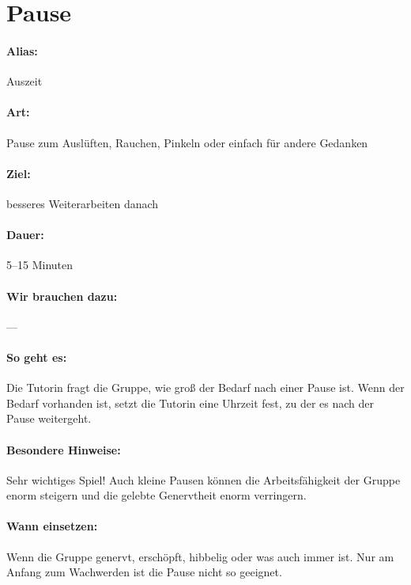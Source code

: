 \section{Pause}
\paragraph{Alias:} Auszeit
\paragraph{Art:} Pause zum Auslüften, Rauchen, Pinkeln oder einfach für andere Gedanken
\paragraph{Ziel:} besseres Weiterarbeiten danach
\paragraph{Dauer:} 5--15 Minuten
\paragraph{Wir brauchen dazu:} ---
\paragraph{So geht es:} Die Tutorin fragt die Gruppe, wie groß der Bedarf nach einer Pause ist. Wenn der Bedarf vorhanden ist, setzt die Tutorin eine Uhrzeit fest, zu der es nach der Pause weitergeht.
\paragraph{Besondere Hinweise:} Sehr wichtiges Spiel! Auch kleine Pausen können die Arbeitsfähigkeit der Gruppe enorm steigern und die gelebte Genervtheit enorm verringern.
\paragraph{Wann einsetzen:} Wenn die Gruppe genervt, erschöpft, hibbelig oder was auch immer ist. Nur am Anfang zum Wachwerden ist die Pause nicht so geeignet.

